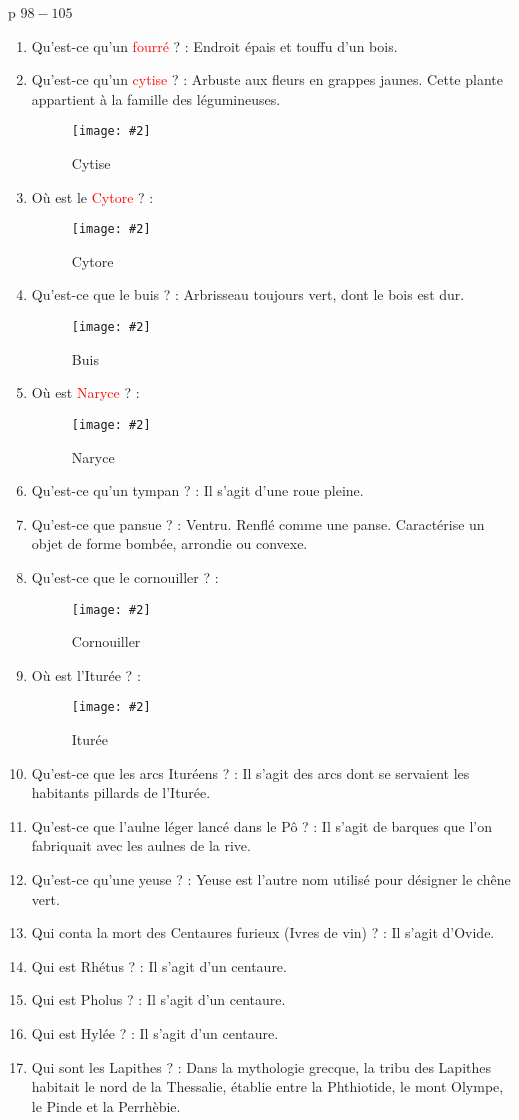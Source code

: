 \documentclass[a4paper, 11pt, hidelinks]{article}
\newcommand{\img}[4]{\begin{figure}[!ht]
    \centering
    \texttt{[image: \#2]}
    \caption{#3}
    \label{#4}
    \end{figure} }
\begin{document}
p $98 - 105$



\begin{enumerate}
      \item Qu'est-ce qu'un \textcolor{red}{fourré} ? : Endroit épais et touffu d'un bois.
      \item Qu'est-ce qu'un \textcolor{red}{cytise} ? : Arbuste aux fleurs en grappes jaunes. Cette plante appartient à la famille des légumineuses.
            \img{0.5}{Cytise.jpg}{Cytise}{95}
      \item Où est le \textcolor{red}{Cytore} ? :
            \img{0.3}{Cytore.png}{Cytore}{96}
      \item Qu'est-ce que le buis ? : Arbrisseau toujours vert, dont le bois est dur.
            \img{0.5}{Buis.jpg}{Buis}{97}
            \newpage
      \item Où est \textcolor{red}{Naryce} ? :
            \img{0.3}{Naryce.png}{Naryce}{98}
      \item Qu'est-ce qu'un tympan ? : Il s'agit d'une roue pleine.
      \item Qu'est-ce que pansue ? : Ventru. Renflé comme une panse. Caractérise un objet de forme bombée, arrondie ou convexe.
      \item Qu'est-ce que le cornouiller ? :
            \img{0.5}{Cornouiller.jpg}{Cornouiller}{99}
      \item Où est l'Iturée ? :
            \img{0.3}{Ituree.png}{Iturée}{100}
      \item Qu'est-ce que les arcs Ituréens ? : Il s'agit des arcs dont se servaient les habitants pillards de l'Iturée.
      \item Qu'est-ce que l'aulne léger lancé dans le Pô ? : Il s'agit de barques que l'on fabriquait avec les aulnes de la rive.
      \item Qu'est-ce qu'une yeuse ? : Yeuse est l'autre nom utilisé pour désigner le chêne vert.
      \item Qui conta la mort des Centaures furieux (Ivres de vin) ? : Il s'agit d'Ovide.
      \item Qui est Rhétus ? : Il s'agit d'un centaure.
      \item Qui est Pholus ? : Il s'agit d'un centaure.
      \item Qui est Hylée ? : Il s'agit d'un centaure.
      \item Qui sont les Lapithes ? : Dans la mythologie grecque, la tribu des Lapithes habitait le nord de la Thessalie, établie entre la Phthiotide, le mont Olympe, le Pinde et la Perrhèbie.

\end{enumerate}
\end{document}
